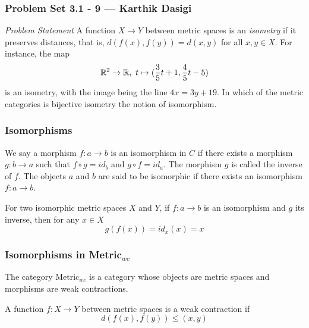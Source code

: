 
\begin{frame}
    \frametitle{Problem Set 3.1 - 9 --- Karthik Dasigi}
    \emph{Problem Statement}
    A function \(X\rightarrow Y\) between metric spaces is an \textit{isometry} if 
    it preserves distances, that is, \(d(f(x),f(y))=d(x,y)\) for all \(x,y \in X\).
    For instance, the map
    \begin{equation}
        \mathbb{R}^2 \rightarrow \mathbb{R} , \text{    } t \mapsto (\frac{3}{5}t+1, \frac{4}{5}t -5)
    \end{equation}
    is an isometry, with the image being the line \(4x =3y + 19\). 
    In which of the metric categories is bijective isometry the notion of isomorphism.
\end{frame}

\begin{frame}
    \frametitle{Isomorphisms}
    \begin{definition}[Isomorphism]
        We say a morphism \(f : a \rightarrow b\) is an isomorphism in \(C\) if there exists a morphism
        \(g : b \rightarrow a\) such that \(f \circ g = id_b\) and \(g \circ f = id_a\). The morphism \(g\) is called the inverse
        of \(f\). The objects \(a\) and \(b\) are said to be isomorphic if there exists an isomorphism \(f:a\rightarrow b\).
    \end{definition}
    \pause
    For two isomorphic metric spaces \(X\) and \(Y\), if \(f:a\rightarrow b\) is an isomorphism and \(g\) its inverse,
    then for any \(x\in X\)
    \begin{equation}
        g(f(x))=id_x(x)=x 
        \label{eqn:gfresult}
    \end{equation}
    
\end{frame}

\begin{frame}
    \frametitle{Isomorphisms in Metric\(_{wc}\)}
    The category Metric\(_{wc}\) is a category whose objects are metric spaces and morphisms are weak contractions.
    \pause
    \begin{definition}
        A function \(f : X \rightarrow Y\) between metric spaces is a
        weak contraction if
        \begin{equation}
            d(f(x),f(y))\leq (x,y)
            \label{eqn:wc}
        \end{equation}
    \end{definition}

\end{frame}

